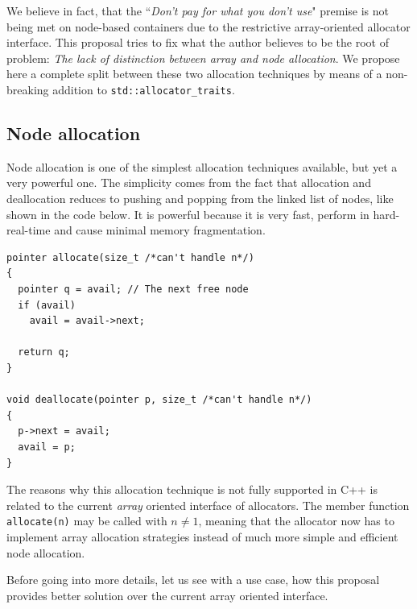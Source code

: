\documentclass[11pt]{article}
\begin{document}
We believe in fact, that the ``{\it Don't pay for what you don't use}" premise
is not being met on node-based containers due to the restrictive
array-oriented allocator interface. This proposal tries to fix what the author
believes to be the root of problem: {\it The lack of distinction between array
and node allocation}.  We propose here a complete split between these two
allocation techniques by means of a non-breaking addition to
\texttt{std::allocator\_traits}.

\subsection{Node allocation}
Node allocation is one of the simplest allocation techniques
available, but yet a very powerful one. The simplicity
comes from the fact that allocation and deallocation reduces to pushing and
popping from the linked list of nodes, like shown in the code below.
It is powerful because it is very fast, perform in hard-real-time
and cause minimal memory fragmentation.

\medskip
\begin{lstlisting}
pointer allocate(size_t /*can't handle n*/)
{
  pointer q = avail; // The next free node
  if (avail)
    avail = avail->next;

  return q;
}

void deallocate(pointer p, size_t /*can't handle n*/)
{
  p->next = avail;
  avail = p;
}

\end{lstlisting}

The reasons why this allocation technique is not fully supported in C++ is
related to the current {\it array} oriented interface of allocators.  The
member function \texttt{allocate(n)} may be called with $n \ne 1$, meaning that
the allocator now has to implement array allocation strategies instead of much
more simple and efficient node allocation.

Before going into more details, let us see with a use case,
how this proposal provides better solution over the current
array oriented interface.
\end{document}
